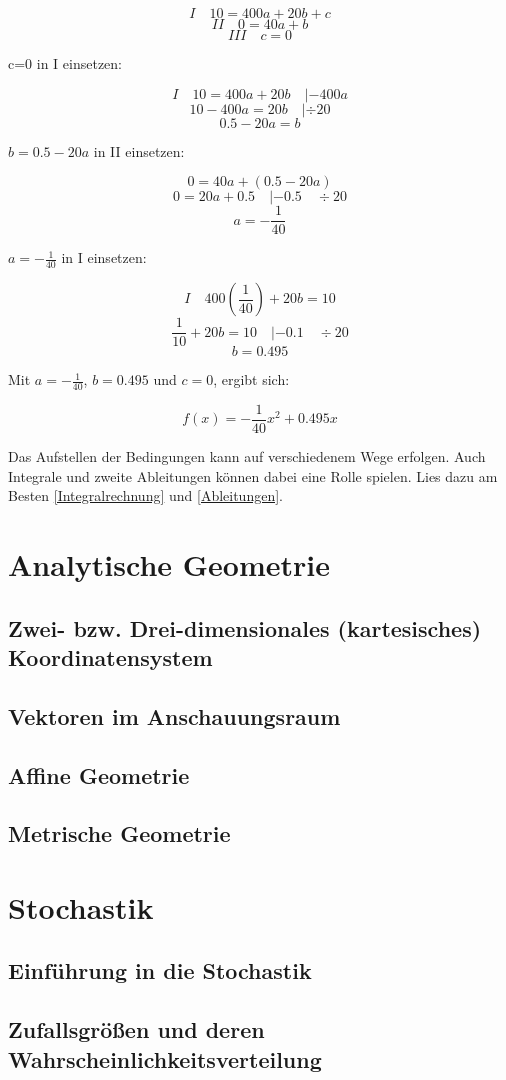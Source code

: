 \documentclass{article}
\begin{document}
\[ I \quad 10=400a+20b+c \]
\[ II \quad 0=40a+b \]
\[ III \quad c=0 \]

c=0 in I einsetzen:

\[I \quad 10=400a+20b \quad |-400a \]
\[ 10-400a=20b \quad | \div 20\]
\[ 0.5-20a=b\]

$b= 0.5-20a $ in II einsetzen:

\[ 0=40a+(0.5-20a)\]
\[ 0=20a+0.5 \quad |-0.5 \quad \div 20\]
\[ a=-\frac{1}{40} \]

$a=-\frac{1}{40}$ in I einsetzen:

\[ I \quad 400(\frac{1}{40})+20b=10 \]
\[ \frac{1}{10}+20b=10 \quad |-0.1 \quad \div 20\]
\[ b=0.495\]

Mit $a=-\frac{1}{40}$, $b=0.495$ und $c=0$, ergibt sich:

\[f(x)=-\frac{1}{40}x^2+0.495x\]

Das Aufstellen der Bedingungen kann auf verschiedenem Wege erfolgen. Auch Integrale und zweite Ableitungen können dabei eine Rolle spielen.
Lies dazu am Besten \ref{Integralrechnung} und \ref{Ableitungen}.

\section{Analytische Geometrie}
\subsection{Zwei- bzw. Drei-dimensionales (kartesisches) Koordinatensystem}
\subsection{Vektoren im Anschauungsraum}
\subsection{Affine Geometrie}
\subsection{Metrische Geometrie}

\section{Stochastik}
\subsection{Einführung in die Stochastik}
\subsection{Zufallsgrößen und deren Wahrscheinlichkeitsverteilung}
\end{document}
